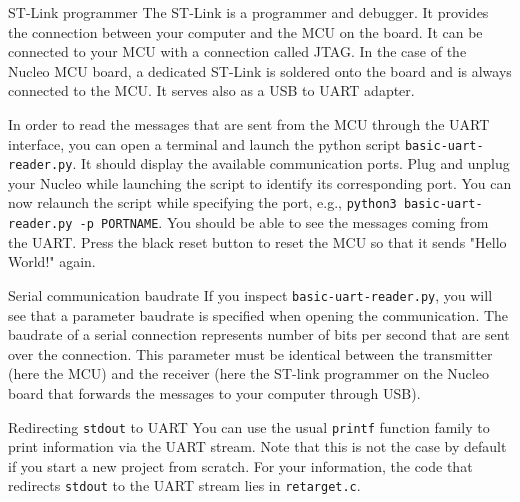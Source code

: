 \begin{bclogo}[couleur = gray!20, arrondi = 0.2, logo=\bcinfo]{ST-Link programmer}
The ST-Link is a programmer and debugger. It provides the connection between your computer and the MCU on the board. It can be connected to your MCU with a connection called JTAG. In the case of the Nucleo MCU board, a dedicated ST-Link is soldered onto the board and is always connected to the MCU. It serves also as a USB to UART adapter.
\end{bclogo}

In order to read the messages that are sent from the MCU through the UART interface, you can open a terminal and launch the python script \texttt{basic-uart-reader.py}. It should display the available communication ports.
Plug and unplug your Nucleo while launching the script to identify its corresponding port. You can now relaunch the script while specifying the port, e.g., \texttt{python3 basic-uart-reader.py -p PORTNAME}.
You should be able to see the messages coming from the UART. Press the black reset button to reset the MCU so that it sends "Hello World!" again.

\begin{bclogo}[couleur = gray!20, arrondi = 0.2, logo=\bcinfo]{Serial communication baudrate }
If you inspect \texttt{basic-uart-reader.py}, you will see that a parameter baudrate is specified when opening the communication. The baudrate of a serial connection represents number of bits per second that are sent over the connection. This parameter must be identical between the transmitter (here the MCU) and the receiver (here the ST-link programmer on the Nucleo board that forwards the messages to your computer through USB). \end{bclogo}



\begin{bclogo}[couleur = gray!20, arrondi = 0.2, logo=\bcinfo]{Redirecting \texttt{stdout} to UART}
You can use the usual \texttt{printf} function family to print information via the UART stream. Note that this is not the case by default if you start a new project from scratch. For your information, the code that redirects \texttt{stdout} to the UART stream lies in \texttt{retarget.c}.
\end{bclogo}


